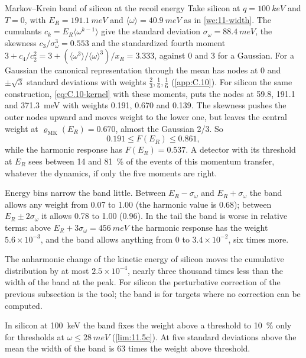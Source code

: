 \begin{workedexample}{Markov--Krein band of silicon at the recoil energy}\label{we:11-mkpeak}
Take silicon at $q = \SI{100}{keV}$ and $T = 0$, with $E_R = \SI{191.1}{meV}$ and $\langle\omega\rangle = \SI{40.9}{meV}$ as in \cref{we:11-width}. The cumulants $c_k = E_R\langle\omega^{k-1}\rangle$ give the standard deviation $\sigma_\omega = \SI{88.4}{meV}$, the skewness $c_3/\sigma_\omega^3 = 0.553$ and the standardized fourth moment $3 + c_4/c_2^2 = 3 + (\langle\omega^3\rangle/\langle\omega\rangle^3)/x_R = 3.333$, against 0 and 3 for a Gaussian. For a Gaussian the canonical representation through the mean has nodes at 0 and $\pm\sqrt3$ standard deviations with weights $\tfrac23, \tfrac16, \tfrac16$ (\cref{app:C.10}). For silicon the same construction, \cref{eq:C.10-kernel} with these moments, puts the nodes at 59.8, 191.1 and \SI{371.3}{meV} with weights 0.191, 0.670 and 0.139. The skewness pushes the outer nodes upward and moves weight to the lower one, but leaves the central weight at $\varrho_{\mathrm{MK}}(E_R) = 0.670$, almost the Gaussian 2/3. So
\begin{equation*}
  0.191 \le F(E_R) \le 0.861 ,
\end{equation*}
while the harmonic response has $F(E_R) = 0.537$. A detector with its threshold at $E_R$ sees between 14 and \SI{81}{\percent} of the events of this momentum transfer, whatever the dynamics, if only the five moments are right.

Energy bins narrow the band little. Between $E_R - \sigma_\omega$ and $E_R + \sigma_\omega$ the band allows any weight from 0.07 to 1.00 (the harmonic value is 0.68); between $E_R \pm 2\sigma_\omega$ it allows 0.78 to 1.00 (0.96). In the tail the band is worse in relative terms: above $E_R + 3\sigma_\omega = \SI{456}{meV}$ the harmonic response has the weight $5.6\times10^{-3}$, and the band allows anything from 0 to $3.4\times10^{-2}$, six times more.

The anharmonic change of the kinetic energy of silicon moves the cumulative distribution by at most $2.5\times10^{-4}$, nearly three thousand times less than the width of the band at the peak. For silicon the perturbative correction of the previous subsection is the tool; the band is for targets where no correction can be computed.
\end{workedexample}

In silicon at \SI{100}{keV} the band fixes the weight above a threshold to \SI{10}{\percent} only for thresholds at $\omega \le \SI{28}{meV}$ (\cref{lim:11.5c}). At five standard deviations above the mean the width of the band is 63 times the weight above threshold.

